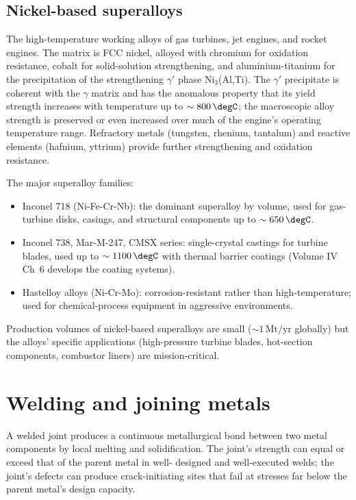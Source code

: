 \subsection{Nickel-based superalloys}

The high-temperature working alloys of gas turbines, jet engines, and
rocket engines. The matrix is FCC nickel, alloyed with chromium for
oxidation resistance, cobalt for solid-solution strengthening, and
aluminium-titanium for the precipitation of the strengthening
$\gamma'$ phase Ni$_3$(Al,Ti). The $\gamma'$ precipitate is coherent
with the $\gamma$ matrix and has the anomalous property that its
yield strength increases with temperature up to $\sim 800\,\degC$;
the macroscopic alloy strength is preserved or even increased over
much of the engine's operating temperature range. Refractory metals
(tungsten, rhenium, tantalum) and reactive elements (hafnium,
yttrium) provide further strengthening and oxidation resistance.

The major superalloy families:

\begin{itemize}[leftmargin=*]
\item Inconel 718 (Ni-Fe-Cr-Nb): the dominant superalloy by volume,
  used for gas-turbine disks, casings, and structural components up
  to $\sim 650\,\degC$.
\item Inconel 738, Mar-M-247, CMSX series: single-crystal castings
  for turbine blades, used up to $\sim 1100\,\degC$ with thermal
  barrier coatings (Volume IV Ch~6 develops the coating systems).
\item Hastelloy alloys (Ni-Cr-Mo): corrosion-resistant rather than
  high-temperature; used for chemical-process equipment in aggressive
  environments.
\end{itemize}

Production volumes of nickel-based superalloys are small ($\sim 1
\,\text{Mt}/\text{yr}$ globally) but the alloys' specific
applications (high-pressure turbine blades, hot-section components,
combustor liners) are mission-critical.

\section{Welding and joining metals}

A welded joint produces a continuous metallurgical bond between two
metal components by local melting and solidification. The joint's
strength can equal or exceed that of the parent metal in well-
designed and well-executed welds; the joint's defects can produce
crack-initiating sites that fail at stresses far below the parent
metal's design capacity.

